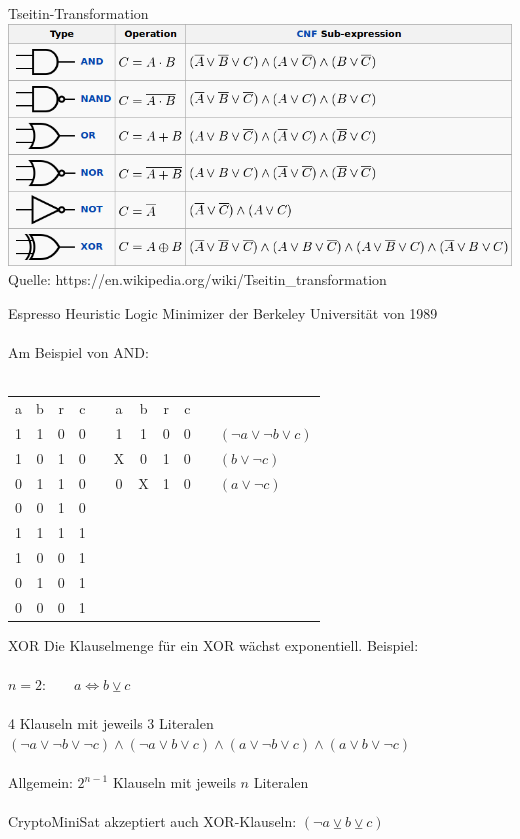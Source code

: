 \documentclass{beamer}
\begin{document}
    \begin{frame}{Tseitin-Transformation}
      \includegraphics[scale=1]{tseitin.png}\\
      Quelle: https://en.wikipedia.org/wiki/Tseitin\_transformation
    \end{frame}
    \begin{frame}{Espresso}
      Heuristic Logic Minimizer der Berkeley Universität von 1989\\
      ~\\
      Am Beispiel von AND:\\
      ~\\
      \begin{tabular}{ccc|cp{1cm}ccc|cp{1cm}l}
        a & b & r & c & & a & b & r & c\\
        \cline{1-4}\cline{6-9}
        1 & 1 & 0 & 0 & & 1 & 1 & 0 & 0 & & $ (\neg a \vee \neg b \vee c) $\\
        1 & 0 & 1 & 0 & & X & 0 & 1 & 0 & & $ (b \vee \neg c) $\\
        0 & 1 & 1 & 0 & & 0 & X & 1 & 0 & & $ (a \vee \neg c) $\\
        0 & 0 & 1 & 0 \\
        \cline{1-4}
        1 & 1 & 1 & 1 \\
        1 & 0 & 0 & 1 \\
        0 & 1 & 0 & 1 \\
        0 & 0 & 0 & 1 \\
      \end{tabular}
    \end{frame}
    \begin{frame}{XOR}
      Die Klauselmenge für ein XOR wächst exponentiell. Beispiel:\\
      ~\\
      $n = 2$:~~~~$ a \Leftrightarrow b \veebar c$\\
      ~\\
      4 Klauseln mit jeweils 3 Literalen
      ~\\
      $ (\neg a \vee \neg b \vee \neg c) \wedge (\neg a \vee b \vee c) \wedge (a \vee \neg b \vee c) \wedge (a \vee b \vee \neg c) $\\
      ~\\
      Allgemein: $ 2^{n - 1} $ Klauseln mit jeweils $ n $ Literalen\\
      ~\\
      CryptoMiniSat akzeptiert auch XOR-Klauseln: $ (\neg a \veebar b \veebar c)$\\
    \end{frame}
\end{document}
